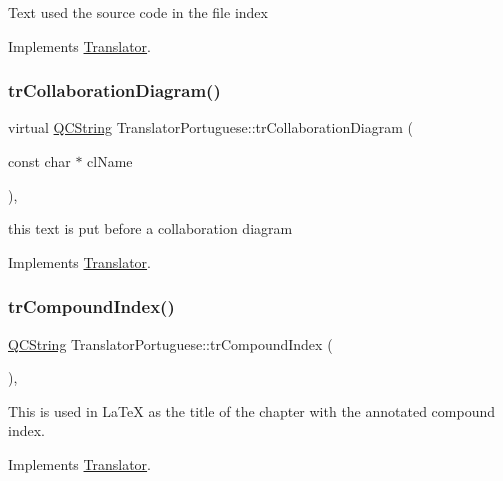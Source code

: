 Text used the source code in the file index 

Implements \mbox{\hyperlink{class_translator}{Translator}}.

\mbox{\label{class_translator_portuguese_a389d0468eeda3d5b7fb6bd8df4687c20}} 
\subsubsection{\texorpdfstring{trCollaborationDiagram()}{trCollaborationDiagram()}}
{\footnotesize\ttfamily virtual \mbox{\hyperlink{class_q_c_string}{Q\+C\+String}} Translator\+Portuguese\+::tr\+Collaboration\+Diagram (\begin{DoxyParamCaption}\item[{const char $\ast$}]{cl\+Name }\end{DoxyParamCaption})\hspace{0.3cm}{\ttfamily [inline]}, {\ttfamily [virtual]}}

this text is put before a collaboration diagram 

Implements \mbox{\hyperlink{class_translator}{Translator}}.

\mbox{\label{class_translator_portuguese_a7ad269611752df5e18f33bcc115d29ee}} 
\subsubsection{\texorpdfstring{trCompoundIndex()}{trCompoundIndex()}}
{\footnotesize\ttfamily \mbox{\hyperlink{class_q_c_string}{Q\+C\+String}} Translator\+Portuguese\+::tr\+Compound\+Index (\begin{DoxyParamCaption}{ }\end{DoxyParamCaption})\hspace{0.3cm}{\ttfamily [inline]}, {\ttfamily [virtual]}}

This is used in La\+TeX as the title of the chapter with the annotated compound index. 

Implements \mbox{\hyperlink{class_translator}{Translator}}.

